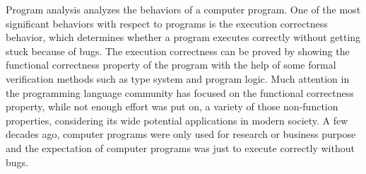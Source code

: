 Program analysis analyzes the behaviors of a computer program.
One of the most significant behaviors with respect to programs is the execution correctness behavior, which determines whether a program executes correctly without getting stuck because of bugs.
 The execution correctness can be proved by showing the functional correctness property of the program with the help of some formal verification methods such as type system and program logic.
 Much attention in the programming language community has focused on the functional correctness property, while not enough effort was put on, a variety of those non-function properties, considering its wide potential applications in modern society. 
 A few decades ago, computer programs were only used for research or business purpose and the expectation of computer programs was just to execute correctly without bugs. 
 



